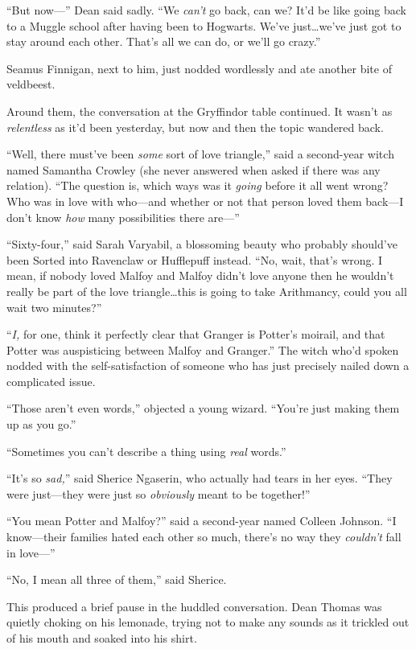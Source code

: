 “But now—” Dean said sadly. “We \emph{can’t} go back, can we? It’d be like going back to a Muggle school after having been to Hogwarts. We’ve just…we’ve just got to stay around each other. That’s all we can do, or we’ll go crazy.”

Seamus Finnigan, next to him, just nodded wordlessly and ate another bite of veldbeest.

Around them, the conversation at the Gryffindor table continued. It wasn’t as \emph{relentless} as it’d been yesterday, but now and then the topic wandered back.

“Well, there must’ve been \emph{some} sort of love triangle,” said a second-year witch named Samantha Crowley (she never answered when asked if there was any relation). “The question is, which ways was it \emph{going} before it all went wrong? Who was in love with who—and whether or not that person loved them back—I don’t know \emph{how} many possibilities there are—”

“Sixty-four,” said Sarah Varyabil, a blossoming beauty who probably should’ve been Sorted into Ravenclaw or Hufflepuff instead. “No, wait, that’s wrong. I mean, if nobody loved Malfoy and Malfoy didn’t love anyone then he wouldn’t really be part of the love triangle…this is going to take Arithmancy, could you all wait two minutes?”

“\emph{I,} for one, think it perfectly clear that Granger is Potter’s moirail, and that Potter was auspisticing between Malfoy and Granger.” The witch who’d spoken nodded with the self-satisfaction of someone who has just precisely nailed down a complicated issue.

“Those aren’t even words,” objected a young wizard. “You’re just making them up as you go.”

“Sometimes you can’t describe a thing using \emph{real} words.”

“It’s so \emph{sad,}” said Sherice Ngaserin, who actually had tears in her eyes. “They were just—they were just so \emph{obviously} meant to be together!”

“You mean Potter and Malfoy?” said a second-year named Colleen Johnson. “I know—their families hated each other so much, there’s no way they \emph{couldn’t} fall in love—”

“No, I mean all three of them,” said Sherice.

This produced a brief pause in the huddled conversation. Dean Thomas was quietly choking on his lemonade, trying not to make any sounds as it trickled out of his mouth and soaked into his shirt.

